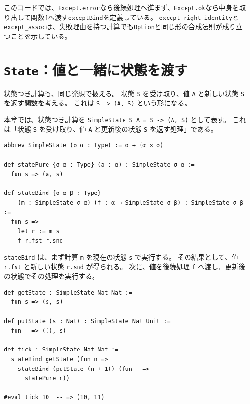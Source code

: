 このコードでは、\texttt{Except.error}なら後続処理へ進まず、\texttt{Except.ok}なら中身を取り出して関数\texttt{f}へ渡す\texttt{exceptBind}を定義している。
\texttt{except\_right\_identity}と\texttt{except\_assoc}は、失敗理由を持つ計算でも\texttt{Option}と同じ形の合成法則が成り立つことを示している。

\section{\texttt{State}：値と一緒に状態を渡す}

状態つき計算も、同じ発想で扱える。
状態 \texttt{S} を受け取り、値 \texttt{A} と新しい状態 \texttt{S} を返す関数を考える。
これは \texttt{S -> (A, S)} という形になる。

\begin{definitionbox}
本章では、状態つき計算を \texttt{SimpleState S A = S -> (A, S)} として表す。
これは「状態 \texttt{S} を受け取り、値 \texttt{A} と更新後の状態 \texttt{S} を返す処理」である。
\end{definitionbox}

\begin{listing}[htbp]
\begin{verbatim}
abbrev SimpleState (σ α : Type) := σ → (α × σ)

def statePure {σ α : Type} (a : α) : SimpleState σ α :=
  fun s => (a, s)

def stateBind {σ α β : Type}
    (m : SimpleState σ α) (f : α → SimpleState σ β) : SimpleState σ β :=
  fun s =>
    let r := m s
    f r.fst r.snd
\end{verbatim}
\caption{状態つき計算の最小モデル}
\label{lst:ch11_state}
\end{listing}

\texttt{stateBind} は、まず計算 \texttt{m} を現在の状態 \texttt{s} で実行する。
その結果として、値 \texttt{r.fst} と新しい状態 \texttt{r.snd} が得られる。
次に、値を後続処理 \texttt{f} へ渡し、更新後の状態でその処理を実行する。

\begin{listing}[htbp]
\begin{verbatim}
def getState : SimpleState Nat Nat :=
  fun s => (s, s)

def putState (s : Nat) : SimpleState Nat Unit :=
  fun _ => ((), s)

def tick : SimpleState Nat Nat :=
  stateBind getState (fun n =>
    stateBind (putState (n + 1)) (fun _ =>
      statePure n))

#eval tick 10  -- => (10, 11)
\end{verbatim}
\caption{カウンタ状態を更新する例}
\label{lst:ch11_state_example}
\end{listing}

